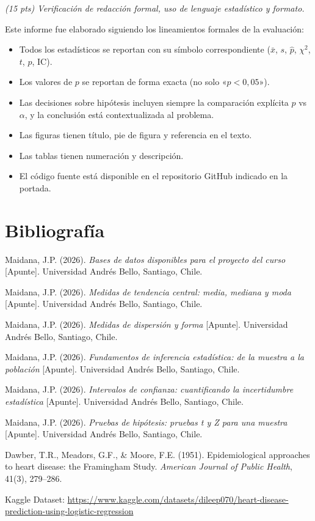 \documentclass[11pt,a4paper]{article}
\newcommand{\guia}[1]{{\small\itshape\color{gris}#1}\par\vspace{0.15em}}
\begin{document}
\guia{(15 pts) Verificación de redacción formal, uso de lenguaje estadístico y formato.}

Este informe fue elaborado siguiendo los lineamientos formales de la evaluación:
\begin{itemize}[noitemsep]
  \item Todos los estadísticos se reportan con su símbolo correspondiente
        ($\bar{x}$, $s$, $\hat{p}$, $\chi^2$, $t$, $p$, IC).
  \item Los valores de $p$ se reportan de forma exacta (no solo «$p<0{,}05$»).
  \item Las decisiones sobre hipótesis incluyen siempre la comparación explícita
        $p$ vs $\alpha$, y la conclusión está contextualizada al problema.
  \item Las figuras tienen título, pie de figura y referencia en el texto.
  \item Las tablas tienen numeración y descripción.
  \item El código fuente está disponible en el repositorio GitHub indicado en la portada.
\end{itemize}

\section*{Bibliografía}

\begin{enumerate}[noitemsep,label={[\arabic*]}]
  \item Maidana, J.P. (2026). \textit{Bases de datos disponibles para el proyecto del curso}
        [Apunte]. Universidad Andrés Bello, Santiago, Chile.
  \item Maidana, J.P. (2026). \textit{Medidas de tendencia central: media, mediana y moda}
        [Apunte]. Universidad Andrés Bello, Santiago, Chile.
  \item Maidana, J.P. (2026). \textit{Medidas de dispersión y forma} [Apunte].
        Universidad Andrés Bello, Santiago, Chile.
  \item Maidana, J.P. (2026). \textit{Fundamentos de inferencia estadística: de la muestra
        a la población} [Apunte]. Universidad Andrés Bello, Santiago, Chile.
  \item Maidana, J.P. (2026). \textit{Intervalos de confianza: cuantificando la
        incertidumbre estadística} [Apunte]. Universidad Andrés Bello, Santiago, Chile.
  \item Maidana, J.P. (2026). \textit{Pruebas de hipótesis: pruebas t y Z para una muestra}
        [Apunte]. Universidad Andrés Bello, Santiago, Chile.
  \item Dawber, T.R., Meadors, G.F., \& Moore, F.E. (1951). Epidemiological approaches to
        heart disease: the Framingham Study.
        \textit{American Journal of Public Health}, 41(3), 279–286.
  \item Kaggle Dataset: \url{https://www.kaggle.com/datasets/dileep070/heart-disease-prediction-using-logistic-regression}
\end{enumerate}
\end{document}
